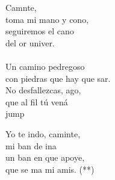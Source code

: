 \begin{cancion}[Caminante][]%
	Camnte,\\
	toma mi mano y cono,\\
	seguiremos el cano\\
	del or univer.\\
	\jump\\
Un camino pedregoso\\
	con piedras que hay que sar.\\
	No desfallezcas, ago,\\
	que al fil tú vená\\jump\\
	\begin{chorus}%
	Yo te indo, caminte,\\
	mi ban de ina\\
	un ban en que apoye, \\
	que se ma mi amis. (**)\\
	\end{chorus}%
	\jump\\
\end{cancion}%
